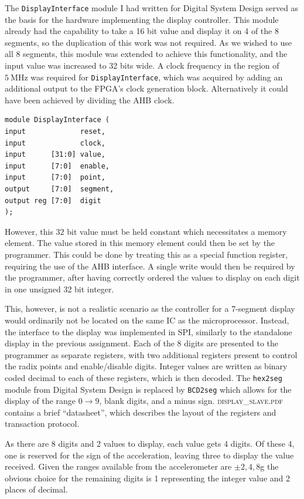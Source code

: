 \documentclass[11pt,british]{report}
\begin{document}
The \texttt{DisplayInterface} module I had written for Digital System Design served as the basis for the hardware implementing the display controller. This module already had the capability to take a 16 bit value and display it on 4 of the 8 segments, so the duplication of this work was not required. As we wished to use all 8 segments, this module was extended to achieve this functionality, and the input value was increased to 32 bits wide.
A clock frequency in the region of $5~\si{\mega\hertz}$ was required for \texttt{DisplayInterface}, which was acquired by adding an additional output to the FPGA's clock generation block. Alternatively it could have been achieved by dividing the AHB clock.
\begin{lstlisting}[style={verilog-style}]
module DisplayInterface (
input             reset,
input             clock,
input      [31:0] value,
input      [7:0]  enable,
input      [7:0]  point,
output     [7:0]  segment, 
output reg [7:0]  digit
);
\end{lstlisting}

However, this $32$ bit value must be held constant which necessitates a memory element. The value stored in this memory element could then be set by the programmer. This could be done by treating this as a special function register, requiring the use of the AHB interface. A single write would then be required by the programmer, after having correctly ordered the values to display on each digit in one unsigned 32 bit integer.

This, however, is not a realistic scenario as the controller for a 7-segment display would ordinarily not be located on the same IC as the microprocessor. Instead, the interface to the display was implemented in SPI, similarly to the standalone display in the previous assignment. Each of the 8 digits are presented to the programmer as separate registers, with two additional registers present to control the radix points and enable/disable digits. Integer values are written as binary coded decimal to each of these registers, which is then decoded. The \texttt{hex2seg} module from Digital System Design is replaced by \texttt{BCD2seg} which allows for the display of the range $0\rightarrow 9$, blank digits, and a minus sign. \textsc{display\_slave.pdf} contains a brief ``datasheet'', which describes the layout of the registers and transaction protocol.

As there are 8 digits and 2 values to display, each value gets 4 digits. Of these 4, one is reserved for the sign of the acceleration, leaving three to display the value received. Given the ranges available from the accelerometer are $\pm2,4,8$g the obvious choice for the remaining digits is 1 representing the integer value and 2 places of decimal.
\end{document}
